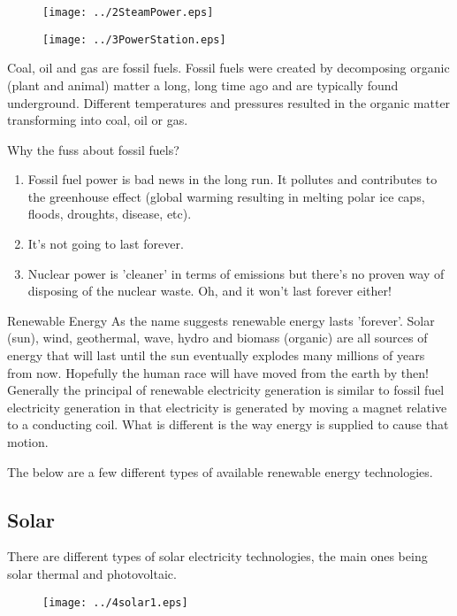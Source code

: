 \begin{figure}[H]
\centering
\texttt{[image: ../2SteamPower.eps]}
\end{figure}

\begin{figure}[H]
\centering
\texttt{[image: ../3PowerStation.eps]}
\end{figure}

Coal, oil and gas are fossil fuels. Fossil fuels were created by
decomposing organic (plant and animal) matter a long, long time ago
and are typically found underground. Different temperatures and
pressures resulted in the organic matter transforming into coal, oil
or gas.

Why the fuss about fossil fuels?
\begin{enumerate}
\item Fossil fuel power is bad news in
the long run. It pollutes and contributes to the greenhouse effect
(global warming resulting in melting polar ice caps, floods,
droughts, disease, etc).
\item It's not going to last forever.
\item Nuclear power is 'cleaner' in terms of emissions but there's no proven way
of disposing of the nuclear waste. Oh, and it won't last forever
either!
\end{enumerate}

Renewable Energy As the name suggests renewable energy lasts
'forever'. Solar (sun), wind, geothermal, wave, hydro and biomass
(organic) are all sources of energy that will last until the sun
eventually explodes many millions of years from now. Hopefully the
human race will have moved from the earth by then! Generally the
principal of renewable electricity generation is similar to fossil
fuel electricity generation in that electricity is generated by
moving a magnet relative to a conducting coil. What is different is
the way energy is supplied to cause that motion.

The below are a few different types of available renewable energy
technologies.

\subsection*{Solar}

There are different types of solar electricity technologies, the
main ones being solar thermal and photovoltaic.

\begin{figure}[H]
\centering
\texttt{[image: ../4solar1.eps]}
\end{figure}

